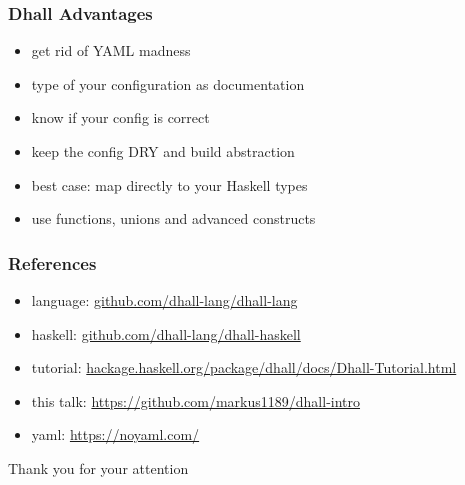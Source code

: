\documentclass{beamer}
\begin{document}
\begin{frame}
  \frametitle{Dhall Advantages}
  \begin{itemize}
  \item get rid of YAML madness
  \item type of your configuration as documentation
  \item know if your config is correct
  \item keep the config DRY and build abstraction
  \item best case: map directly to your Haskell types
  \item use functions, unions and advanced constructs
  \end{itemize}
\end{frame}

\begin{frame}
  \frametitle{References}
  \begin{itemize}
  \item language: \url{github.com/dhall-lang/dhall-lang}
  \item haskell: \url{github.com/dhall-lang/dhall-haskell}
  \item tutorial: \url{hackage.haskell.org/package/dhall/docs/Dhall-Tutorial.html}
  \item this talk: \url{https://github.com/markus1189/dhall-intro}
  \item yaml: \url{https://noyaml.com/}
  \end{itemize}
\end{frame}

\begin{frame}
  \begin{center}
    {\Huge Thank you for your attention}
  \end{center}
\end{frame}
\end{document}
